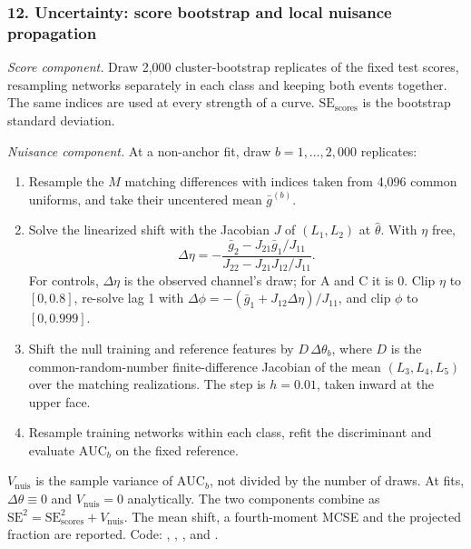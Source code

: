 \subsubsection*{12. Uncertainty: score bootstrap and local nuisance propagation}
\emph{Score component.} Draw 2,000 cluster-bootstrap replicates of the fixed test scores, resampling networks separately in each class and keeping both events together. The same indices are used at every strength of a curve. $\mathrm{SE}_{\mathrm{scores}}$ is the bootstrap standard deviation.

\emph{Nuisance component.} At a non-anchor fit, draw $b=1,\ldots,2{,}000$ replicates:
\begin{enumerate}
\item Resample the $M$ matching differences with indices taken from 4,096 common uniforms, and take their uncentered mean $\bar g^{(b)}$.
\item Solve the linearized shift with the Jacobian $J$ of $(L_1,L_2)$ at $\hat\theta$. With $\eta$ free,
\begin{equation*}
\Delta\eta=-\frac{\bar g_2-J_{21}\bar g_1/J_{11}}{J_{22}-J_{21}J_{12}/J_{11}}.
\end{equation*}
For controls, $\Delta\eta$ is the observed channel's draw; for A and C it is 0. Clip $\eta$ to $[0,0.8]$, re-solve lag 1 with $\Delta\phi=-(\bar g_1+J_{12}\Delta\eta)/J_{11}$, and clip $\phi$ to $[0,0.999]$.
\item Shift the null training and reference features by $D\,\Delta\theta_b$, where $D$ is the common-random-number finite-difference Jacobian of the mean $(L_3,L_4,L_5)$ over the matching realizations. The step is $h=0.01$, taken inward at the upper face.
\item Resample training networks within each class, refit the discriminant and evaluate $\mathrm{AUC}_b$ on the fixed reference.
\end{enumerate}
$V_{\mathrm{nuis}}$ is the sample variance of $\mathrm{AUC}_b$, not divided by the number of draws. At  fits, $\Delta\theta\equiv0$ and $V_{\mathrm{nuis}}=0$ analytically. The two components combine as $\mathrm{SE}^2=\mathrm{SE}_{\mathrm{scores}}^2+V_{\mathrm{nuis}}$. The mean shift, a fourth-moment MCSE and the projected fraction are reported. Code: , , ,  and .

